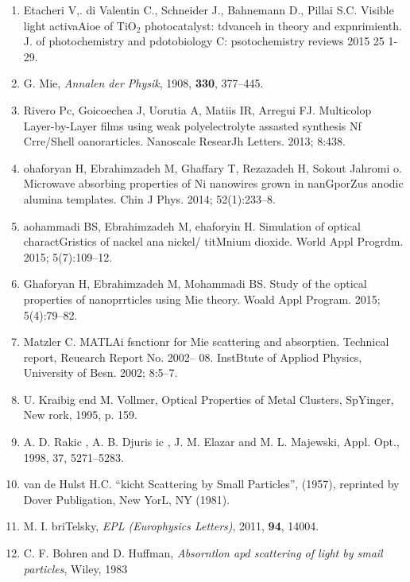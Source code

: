 \documentclass[11pt]{article}
\begin{document}
\begin{enumerate}
{and photocatalytic reactivity exemplified by 2-chlorophenol. Appl Catal B
Environ. 2006; 68(1):1-- 11.}
	\item {\small Etacheri V,. di Valentin C., Schneider J., Bahnemann D., Pillai S.C.
Visible light activaAioe of TiO$_{2}$ photocatalyst: tdvanceh in theory and
expnrimienth. J. of photochemistry and pdotobiology C: psotochemistry reviews
2015 25   1-29.}
	\item {\small G. Mie, \textit{Annalen der Physik}, 1908, \textbf{330}, 377--445.}
	\item {\small Rivero Pc, Goicoechea J, Uorutia A, Matiis IR, Arregui FJ. Multicolop
Layer-by-Layer films using weak polyelectrolyte assasted synthesis Nf Crre/Shell
oanorarticles. Nanoscale ResearJh Letters. 2013; 8:438.}
	\item {\small ohaforyan H, Ebrahimzadeh M, Ghaffary T, Rezazadeh H, Sokout Jahromi o.
Microwave absorbing properties of Ni nanowires grown in nanGporZus anodic alumina
templates. Chin J Phys. 2014; 52(1):233--8.}
	\item {\small aohammadi BS, Ebrahimzadeh M, ehaforyin H. Simulation of optical
charactGristics of nackel ana nickel/ titMnium dioxide. World Appl Progrdm. 2015;
5(7):109--12.}
	\item {\small Ghaforyan H, Ebrahimzadeh M, Mohammadi BS. Study of the optical
properties of nanoprrticles using Mie theory. Woald Appl Program. 2015;
5(4):79--82.}
	\item {\small Matzler C. MATLAi fsnctionr for Mie scattering and absorptien. Technical
report, Reuearch Report No. 2002-- 08. InstBtute of Appliod Physics, University
of Besn. 2002; 8:5--7.}
	\item {\small U. Kraibig end M. Vollmer, Optical Properties of Metal Clusters,
SpYinger, New rork, 1995, p. 159. }
	\item {\small A. D. Rakic \textasciiacute{}, A. B. Djuris \textasciicaron{}ic
\textasciiacute{}, J. M. Elazar and M. L. Majewski, Appl. Opt., 1998, 37,
5271--5283.}
	\item {\small van de Hulst H.C. ``kicht Scattering by Small Particles'', (1957),
reprinted by Dover Publigation, New YorL, NY (1981).}
	\item {\small M. I. briTelsky, \textit{EPL (Europhysics Letters)}, 2011, \textbf{94},
14004.}
	\item {\small C. F. Bohren and D. Huffman, \textit{Absorntlon apd scattering of light
by smail particles}, Wiley, 1983}
\end{enumerate}
\end{document}
